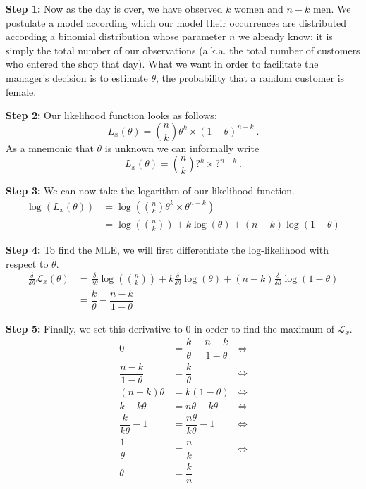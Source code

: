 \textbf{Step 1:} Now as the day is over, we have observed $ k $ women and $ n-k $ men. We postulate a model
according which our model their
occurrences are distributed according a binomial distribution whose parameter $ n $ we already know: it
is simply the total number of our observations (a.k.a. the total number of customers who entered the shop 
that day). What we want in order to facilitate the manager's decision is to estimate $ \theta $, the
probability that a random customer is female. 

\textbf{Step 2:} Our likelihood function looks as follows:
\begin{equation}
L_{x}(\theta) = \binom{n}{k} \theta^{k} \times (1 - \theta)^{n-k} \ .
\end{equation}
As a mnemonic that $ \theta $ is unknown we can informally write
$$ L_{x}(\theta) = \binom{n}{k} ?^{k} \times ?^{n-k} \ . $$

\textbf{Step 3:} We can now take the logarithm of our likelihood function.
\begin{align}
\log(L_{x}(\theta)) &= \log\left(\binom{n}{k} \theta^{k} \times \theta^{n-k} \right) \\
&= \log \left(\binom{n}{k}\right) + k\log(\theta) + (n-k)\log(1-\theta)
\end{align}

\textbf{Step 4:} To find the MLE, we will first differentiate the log-likelihood with respect to $ \theta $.
\begin{align}
\frac{\delta}{\delta \theta} \mathcal{L}_{x}(\theta)
&= \frac{\delta}{\delta \theta} \log \left(\binom{n}{k}\right) + k \frac{\delta}{\delta \theta} \log(\theta) + (n-k) \frac{\delta}{\delta \theta} \log(1-\theta) \\
&= \dfrac{k}{\theta} - \dfrac{n-k}{1-\theta}
\end{align}

\textbf{Step 5:} Finally, we set this derivative to 0 in order to find the maximum of $ \mathcal{L}_{x} $.
\begin{align}
0 &= \dfrac{k}{\theta} - \dfrac{n-k}{1-\theta} &\Leftrightarrow \\
\dfrac{n-k}{1- \theta} &= \dfrac{k}{\theta} &\Leftrightarrow \\
(n-k) \theta &= k (1 - \theta) &\Leftrightarrow \\
k -k\theta &= n\theta - k\theta &\Leftrightarrow \\
\dfrac{k}{k\theta} - 1 &= \dfrac{n\theta}{k\theta} - 1 &\Leftrightarrow \\ 
\dfrac{1}{\theta} &= \dfrac{n}{k} &\Leftrightarrow \\
\theta &= \dfrac{k}{n}
\end{align}

